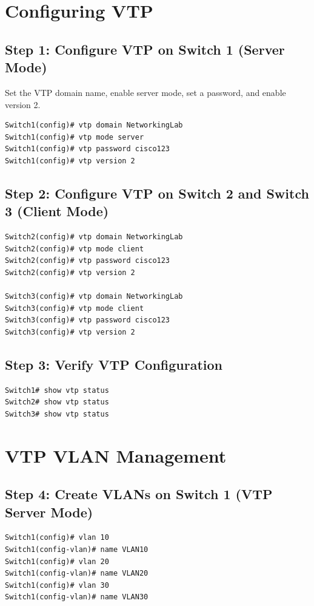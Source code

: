 \documentclass[a4paper]{book}
\begin{document}
\section{Configuring VTP}
\subsection{Step 1: Configure VTP on Switch 1 (Server Mode)}
Set the VTP domain name, enable server mode, set a password, and enable version 2.
\begin{lstlisting}
Switch1(config)# vtp domain NetworkingLab
Switch1(config)# vtp mode server
Switch1(config)# vtp password cisco123
Switch1(config)# vtp version 2
\end{lstlisting}

\subsection{Step 2: Configure VTP on Switch 2 and Switch 3 (Client Mode)}
\begin{lstlisting}
Switch2(config)# vtp domain NetworkingLab
Switch2(config)# vtp mode client
Switch2(config)# vtp password cisco123
Switch2(config)# vtp version 2

Switch3(config)# vtp domain NetworkingLab
Switch3(config)# vtp mode client
Switch3(config)# vtp password cisco123
Switch3(config)# vtp version 2
\end{lstlisting}

\subsection{Step 3: Verify VTP Configuration}
\begin{lstlisting}
Switch1# show vtp status
Switch2# show vtp status
Switch3# show vtp status
\end{lstlisting}

\section{VTP VLAN Management}
\subsection{Step 4: Create VLANs on Switch 1 (VTP Server Mode)}
\begin{lstlisting}
Switch1(config)# vlan 10
Switch1(config-vlan)# name VLAN10
Switch1(config)# vlan 20
Switch1(config-vlan)# name VLAN20
Switch1(config)# vlan 30
Switch1(config-vlan)# name VLAN30
\end{lstlisting}
\end{document}
